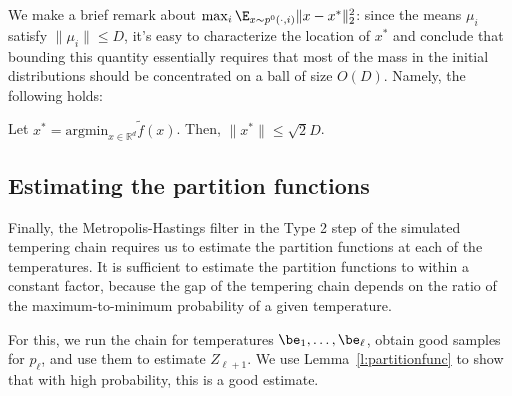 We make a brief remark about $\max_i \E_{x \sim p^0( \cdot, i)}\|x - x^*\|_2^2 $: since the means $\mu_i$ satisfy $\|\mu_i\| \leq D$, it's easy to characterize the location of $x^*$ and conclude that bounding this quantity essentially requires that most of the mass in the initial distributions should be concentrated on a ball of size $O(D)$. Namely, the following holds:  

\begin{lem} Let $x^* = \mbox{argmin}_{x \in \mathbb{R}^d} \tilde{f}(x)$. Then, $\|x^*\| \leq \sqrt{2} D$.  
\end{lem} 

\subsection{Estimating the partition functions}
\label{sec:partitionfunc}
Finally, the Metropolis-Hastings filter in the Type 2 step of the simulated tempering chain requires us to estimate the partition functions at each of the temperatures. It is sufficient to estimate the partition functions to within a constant factor, because the gap of the tempering chain depends on the ratio of the maximum-to-minimum probability of a given temperature.  

For this, we run the chain for temperatures $\be_1,\ldots, \be_\ell$, obtain good samples for $p_\ell$, and use them to estimate $Z_{\ell+1}$. We use Lemma~\ref{l:partitionfunc} to show that with high probability, this is a good estimate.




 